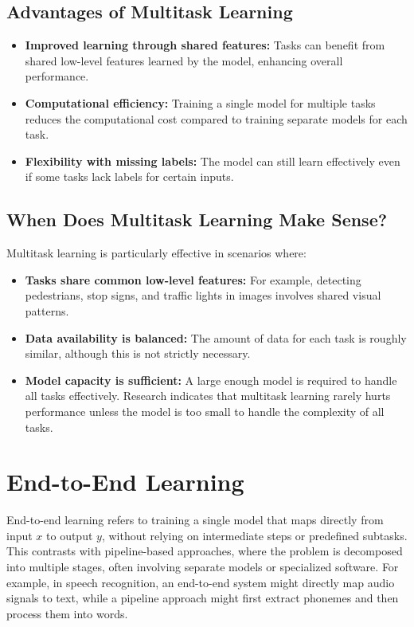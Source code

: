 \documentclass[12pt,openany, draft]{book}
\begin{document}
\subsection{Advantages of Multitask Learning}

\begin{itemize}
    \item \textbf{Improved learning through shared features:} Tasks can benefit from shared low-level features learned by the model, enhancing overall performance.
    \item \textbf{Computational efficiency:} Training a single model for multiple tasks reduces the computational cost compared to training separate models for each task.
    \item \textbf{Flexibility with missing labels:} The model can still learn effectively even if some tasks lack labels for certain inputs.
\end{itemize}


\subsection{When Does Multitask Learning Make Sense?}

Multitask learning is particularly effective in scenarios where:
\begin{itemize}
    \item \textbf{Tasks share common low-level features:} For example, detecting pedestrians, stop signs, and traffic lights in images involves shared visual patterns.
    \item \textbf{Data availability is balanced:} The amount of data for each task is roughly similar, although this is not strictly necessary.
    \item \textbf{Model capacity is sufficient:} A large enough model is required to handle all tasks effectively. Research indicates that multitask learning rarely hurts performance unless the model is too small to handle the complexity of all tasks.
\end{itemize}



\section{End-to-End Learning}

End-to-end learning refers to training a single model that maps directly from input \(x\) to output \(y\), without relying on intermediate steps or predefined subtasks. This contrasts with pipeline-based approaches, where the problem is decomposed into multiple stages, often involving separate models or specialized software. For example, in speech recognition, an end-to-end system might directly map audio signals to text, while a pipeline approach might first extract phonemes and then process them into words.
\end{document}
